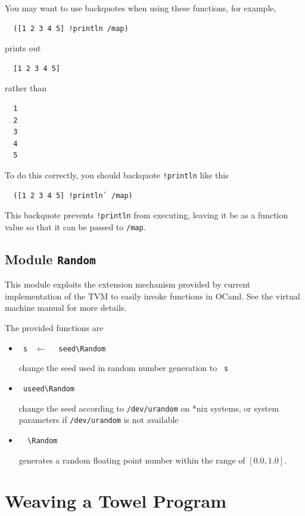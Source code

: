 \documentclass{report}
\newcommand{\mtilde}[1]{\textasciitilde}
\newcommand{\marg}[1]{\texttt{\mtilde ~#1}}
\newcommand{\mla}[0]{~$\leftarrow$ ~}
\begin{document}
\begin{mdframed}[style=hint]
  You may want to use backquotes when using these functions, for example,

\begin{verbatim}
  ([1 2 3 4 5] !println /map)
\end{verbatim}

prints out
\begin{verbatim}
  [1 2 3 4 5]
\end{verbatim}

rather than
\begin{verbatim}
  1
  2
  3
  4
  5
\end{verbatim}

To do this correctly, you should backquote \texttt{!println} like this

\begin{verbatim}
  ([1 2 3 4 5] !println` /map)
\end{verbatim}

This backquote prevents \texttt{!println} from executing, leaving it be as a function value so that it can be passed to \texttt{/map}.
\end{mdframed}

\section{Module \texttt{Random}}

This module exploits the extension mechanism provided by current implementation of the TVM to easily invoke functions in OCaml. See the virtual machine manual for more details.

The provided functions are
\begin{itemize}
\item \marg{s} \mla \texttt{\mtilde ~seed\textbackslash Random}

change the seed used in random number generation to \marg{s}
\item \texttt{\mtilde ~useed\textbackslash Random}

change the seed according to \texttt{/dev/urandom} on *nix systems, or system parameters if \texttt{/dev/urandom} is not available
\item \texttt{\mtilde ~\mtilde ~\textbackslash Random}

generates a random floating point number within the range of $[0.0, 1.0]$.
\end{itemize}


\chapter{Weaving a Towel Program}
\end{document}
